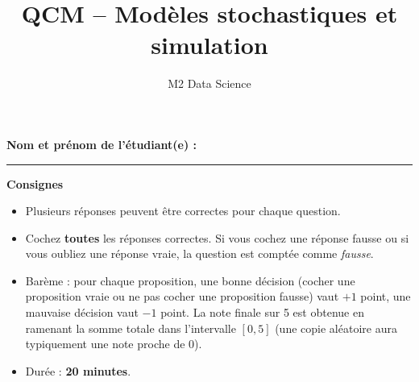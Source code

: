 \documentclass[a4paper,11pt]{article}
\title{QCM -- Modèles stochastiques et simulation}
\author{M2 Data Science}
\date{}
\begin{document}
\maketitle

\vspace*{1em}
\noindent\textbf{Nom et prénom de l'étudiant(e) :} \rule{0.6\textwidth}{0.4pt}

\noindent\textbf{Consignes}
\begin{itemize}
  \item Plusieurs réponses peuvent être correctes pour chaque question.
  \item Cochez \textbf{toutes} les réponses correctes. Si vous cochez une réponse fausse ou si vous oubliez une réponse vraie, la question est comptée comme \emph{fausse}.
  \item Barème : pour chaque proposition, une bonne décision (cocher une proposition vraie ou ne pas cocher une proposition fausse) vaut $+1$ point, une mauvaise décision vaut $-1$ point. La note finale sur 5 est obtenue en ramenant la somme totale dans l'intervalle $[0,5]$ (une copie aléatoire aura typiquement une note proche de 0).
  \item Durée : \textbf{20 minutes}.
\end{itemize}

\bigskip
\end{document}
